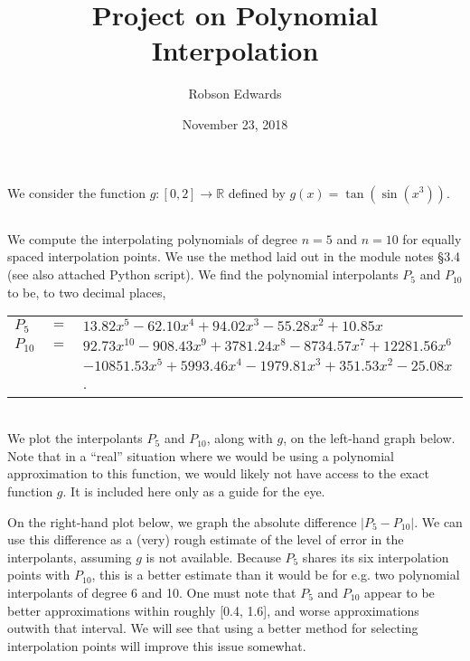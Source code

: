 \documentclass[11pt, oneside]{article}
\title{Project on Polynomial Interpolation}
\author{Robson Edwards}
\date{November 23, 2018}							%
\begin{document}
\maketitle

\section{}

We consider the function $g: [0, 2] \rightarrow \mathbb{R}$ defined by
$g(x) = \tan(\sin(x^3))$.

\subsection{}

We compute the interpolating polynomials of degree $n = 5$ and $n = 10$ for equally spaced interpolation points. We use the method laid out in the module notes \S 3.4 (see also attached Python script). We find the polynomial interpolants $P_5$ and $P_{10}$ to be, to two decimal places,
\\

\begin{tabular}{l c l}
$P_5$ & $=$ & $13.82x^5 -62.10x^4 + 94.02x^3 -55.28x^2 + 10.85x$ \\
$P_{10}$ & $=$ &
$92.73x^{10} -908.43x^9 + 3781.24x^8 -8734.57x^7 + 12281.56x^6$ \\
& & $-10851.53x^5 + 5993.46x^4 -1979.81x^3 + 351.53x^2  -25.08x  $.
\end{tabular}
\\
\flushleft
We plot the interpolants $P_5$ and $P_{10}$, along with $g$, on the left-hand graph below. Note that in a ``real'' situation where we would be using a polynomial approximation to this function, we would likely not have access to the exact function $g$. It is included here only as a guide for the eye. 

On the right-hand plot below, we graph the absolute difference $|P_5-P_{10}|$. We can use this difference as a (very) rough estimate of the level of error in the interpolants, assuming $g$ is not available. Because $P_5$ shares its six interpolation points with $P_{10}$, this is a better estimate than it would be for e.g. two polynomial interpolants of degree 6 and 10. One must note that $P_5$ and $P_{10}$ appear to be better approximations within roughly [0.4, 1.6], and worse approximations outwith that interval. We will see that using a better method for selecting interpolation points will improve this issue somewhat. 
\end{document}
